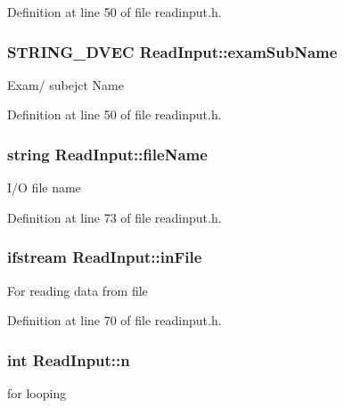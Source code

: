 Definition at line 50 of file readinput.\-h.

\hypertarget{classReadInput_a6ac62618d1b89d823230ae93c7b85c3b}{
\subsubsection[{exam\-Sub\-Name}]{\setlength{\rightskip}{0pt plus 5cm}S\-T\-R\-I\-N\-G\-\_\-D\-V\-E\-C Read\-Input\-::exam\-Sub\-Name\hspace{0.3cm}{\ttfamily [protected]}}}\label{classReadInput_a6ac62618d1b89d823230ae93c7b85c3b}
Exam/ subejct Name 

Definition at line 50 of file readinput.\-h.

\hypertarget{classReadInput_a834acf783052b5b2f129644b4accaadc}{
\subsubsection[{file\-Name}]{\setlength{\rightskip}{0pt plus 5cm}string Read\-Input\-::file\-Name\hspace{0.3cm}{\ttfamily [protected]}}}\label{classReadInput_a834acf783052b5b2f129644b4accaadc}
I/\-O file name 

Definition at line 73 of file readinput.\-h.

\hypertarget{classReadInput_afe0f493fcb2da1f644445501823fd0e2}{
\subsubsection[{in\-File}]{\setlength{\rightskip}{0pt plus 5cm}ifstream Read\-Input\-::in\-File\hspace{0.3cm}{\ttfamily [protected]}}}\label{classReadInput_afe0f493fcb2da1f644445501823fd0e2}
For reading data from file 

Definition at line 70 of file readinput.\-h.

\hypertarget{classReadInput_a00428413f6f29154a5d1170c768bbe35}{
\subsubsection[{n}]{\setlength{\rightskip}{0pt plus 5cm}int Read\-Input\-::n\hspace{0.3cm}{\ttfamily [protected]}}}\label{classReadInput_a00428413f6f29154a5d1170c768bbe35}
for looping 


